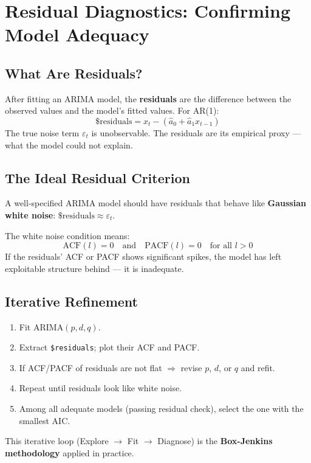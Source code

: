 \documentclass[11pt]{article}
\begin{document}
\section{Residual Diagnostics: Confirming Model Adequacy}

\subsection{What Are Residuals?}
After fitting an ARIMA model, the \textbf{residuals} are the difference
between the observed values and the model's fitted values. For AR(1):
\[
\$\text{residuals} = x_t - \left(\hat{a}_0 + \hat{a}_1 x_{t-1}\right)
\]
The true noise term $\varepsilon_t$ is unobservable. The residuals are its
empirical proxy --- what the model could not explain.

\subsection{The Ideal Residual Criterion}
A well-specified ARIMA model should have residuals that behave like
\textbf{Gaussian white noise}: $\$\text{residuals} \approx \varepsilon_t$.

The white noise condition means:
\[
\text{ACF}(l) = 0 \quad \text{and} \quad \text{PACF}(l) = 0
\quad \text{for all } l > 0
\]
If the residuals' ACF or PACF shows significant spikes, the model has left
exploitable structure behind --- it is inadequate.

\subsection{Iterative Refinement}
\begin{enumerate}
    \item Fit ARIMA$(p,d,q)$.
    \item Extract \texttt{\$residuals}; plot their ACF and PACF.
    \item If ACF/PACF of residuals are not flat $\Rightarrow$ revise $p$,
      $d$, or $q$ and refit.
    \item Repeat until residuals look like white noise.
    \item Among all adequate models (passing residual check), select the
      one with the smallest AIC.
\end{enumerate}

This iterative loop (Explore $\to$ Fit $\to$ Diagnose) is the
\textbf{Box-Jenkins methodology} applied in practice.
\end{document}
